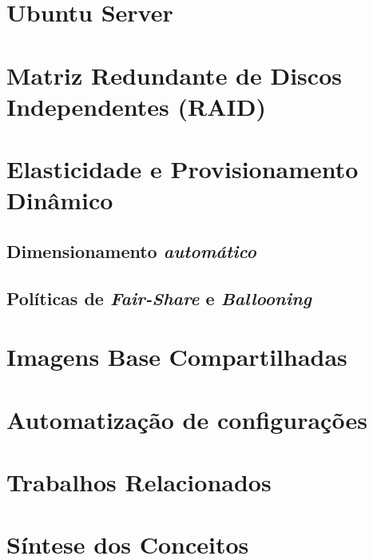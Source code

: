 \section{Ubuntu Server}



\section{Matriz Redundante de Discos Independentes (RAID)}

\section{Elasticidade e Provisionamento Dinâmico}

\subsection{Dimensionamento \textit{automático}}

\subsection{Políticas de \textit{Fair-Share} e \textit{Ballooning}}

\section{Imagens Base Compartilhadas}

\section{Automatização de configurações}

\section{Trabalhos Relacionados}

\section{Síntese dos Conceitos}
